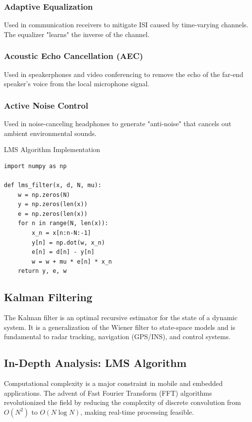 \subsubsection{Adaptive Equalization}
Used in communication receivers to mitigate ISI caused by time-varying channels. The equalizer "learns" the inverse of the channel.

\subsubsection{Acoustic Echo Cancellation (AEC)}
Used in speakerphones and video conferencing to remove the echo of the far-end speaker's voice from the local microphone signal.

\subsubsection{Active Noise Control}
Used in noise-canceling headphones to generate "anti-noise" that cancels out ambient environmental sounds.

\begin{pythonbox}{LMS Algorithm Implementation}
\begin{verbatim}
import numpy as np

def lms_filter(x, d, N, mu):
    w = np.zeros(N)
    y = np.zeros(len(x))
    e = np.zeros(len(x))
    for n in range(N, len(x)):
        x_n = x[n:n-N:-1]
        y[n] = np.dot(w, x_n)
        e[n] = d[n] - y[n]
        w = w + mu * e[n] * x_n
    return y, e, w
\end{verbatim}
\end{pythonbox}

\subsection{Kalman Filtering}
The Kalman filter is an optimal recursive estimator for the state of a dynamic system. It is a generalization of the Wiener filter to state-space models and is fundamental to radar tracking, navigation (GPS/INS), and control systems.

\subsection{In-Depth Analysis: LMS Algorithm}
Computational complexity is a major constraint in mobile and embedded applications. The advent of Fast Fourier Transform (FFT) algorithms revolutionized the field by reducing the complexity of discrete convolution from $O(N^2)$ to $O(N \log N)$, making real-time processing feasible.

